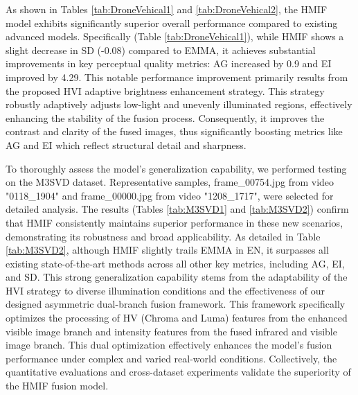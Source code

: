 \documentclass[journal]{IEEEtran}
\begin{document}
As shown in Tables \ref{tab:DroneVehical1} and \ref{tab:DroneVehical2}, the HMIF model exhibits significantly superior overall performance compared to existing advanced models. Specifically (Table \ref{tab:DroneVehical1}), while HMIF shows a slight decrease in SD (-0.08) compared to EMMA, it achieves substantial improvements in key perceptual quality metrics: AG increased by 0.9 and EI improved by 4.29. This notable performance improvement primarily results from the proposed HVI adaptive brightness enhancement strategy. This strategy robustly adaptively adjusts low-light and unevenly illuminated regions, effectively enhancing the stability of the fusion process. Consequently, it improves the contrast and clarity of the fused images, thus significantly boosting metrics like AG and EI which reflect structural detail and sharpness.

To thoroughly assess the model's generalization capability, we performed testing on the M3SVD dataset. Representative samples, frame\_00754.jpg from video "0118\_1904" and frame\_00000.jpg from video "1208\_1717", were selected for detailed analysis. The results (Tables \ref{tab:M3SVD1} and \ref{tab:M3SVD2}) confirm that HMIF consistently maintains superior performance in these new scenarios, demonstrating its robustness and broad applicability. As detailed in Table \ref{tab:M3SVD2}, although HMIF slightly trails EMMA in EN, it surpasses all existing state-of-the-art methods across all other key metrics, including AG, EI, and SD. This strong generalization capability stems from the adaptability of the HVI strategy to diverse illumination conditions and the effectiveness of our designed asymmetric dual-branch fusion framework. This framework specifically optimizes the processing of HV (Chroma and Luma) features from the enhanced visible image branch and intensity features from the fused infrared and visible image branch. This dual optimization effectively enhances the model's fusion performance under complex and varied real-world conditions. Collectively, the quantitative evaluations and cross-dataset experiments validate the superiority of the HMIF fusion model.
\end{document}

